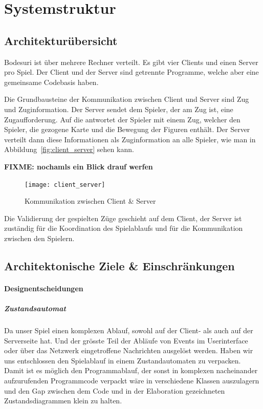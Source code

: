 \documentclass[12pt,halfparskip]{scrartcl}
\begin{document}


\section{Systemstruktur} %
\label{Systemstruktur}

\subsection{Architekturübersicht} %
\label{sub:architekturuebersicht}

Bodesuri ist über mehrere Rechner verteilt. Es gibt vier Clients und einen Server pro Spiel. Der Client und der Server sind getrennte Programme, welche aber eine gemeinsame Codebasis haben.

Die Grundbausteine der Kommunikation zwischen Client und Server sind Zug und Zuginformation. Der Server sendet dem Spieler, der am Zug ist, eine Zugaufforderung. Auf die antwortet der Spieler mit einem Zug, welcher den Spieler, die gezogene Karte und die Bewegung der Figuren enthält. Der Server verteilt dann diese Informationen als Zuginformation an alle Spieler, wie man in Abbildung~\vref{fig:client_server} sehen kann.

\textbf{FIXME: nochamls ein Blick drauf werfen}

\begin{figure}[h]
	\centering
	\texttt{[image: client\_server]}
	\caption{Kommunikation zwischen Client \& Server}
	\label{fig:client_server}
\end{figure}

Die Validierung der gespielten Züge geschieht auf dem Client, der Server ist zuständig für die Koordination des Spielablaufs und für die Kommunikation zwischen den Spielern.

\subsection{Architektonische Ziele \& Einschränkungen} %
\label{sub:architektonische_ziele_einschraenkungen}
\paragraph{Designentscheidungen}\label{ssub:designentscheidungen} %
\subparagraph{Zustandsautomat} %
\label{ssub:zustandsautomat}
Da unser Spiel einen komplexen Ablauf, sowohl auf der Client- als auch auf der Serverseite hat. Und der grösste Teil der Abläufe von Events im Userinterface oder über das Netzwerk eingetroffene Nachrichten ausgelöst werden. Haben wir uns entschlossen den Spielablauf in einem Zustandautomaten zu verpacken.
Damit ist es möglich den Programmablauf, der sonst in komplexen nacheinander aufzurufenden Programmcode verpackt wäre in verschiedene Klassen auszulagern und den Gap zwischen dem Code und in der Elaboration gezeichneten Zustandsdiagrammen klein zu halten.
\end{document}
